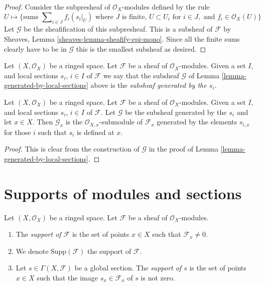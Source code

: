 \begin{proof}
Consider the subpresheaf of $\mathcal{O}_X$-modules
defined by the rule
$$
U
\longmapsto
\{
\text{sums } \sum\nolimits_{i \in J} f_i (s_i|_U)
\text{ where } J \text{ is finite, }
U \subset U_i \text{ for } i\in J, \text{ and }
f_i \in \mathcal{O}_X(U)
\}
$$
Let $\mathcal{G}$ be the sheafification of this subpresheaf.
This is a subsheaf of $\mathcal{F}$ by
Sheaves, Lemma \ref{sheaves-lemma-sheafify-epi-mono}.
Since all the finite sums clearly have to be in $\mathcal{G}$
this is the smallest subsheaf as desired.
\end{proof}

\begin{definition}
\label{definition-generated-by-local-sections}
Let $(X, \mathcal{O}_X)$ be a ringed space.
Let $\mathcal{F}$ be a sheaf of $\mathcal{O}_X$-modules.
Given a set $I$, and
local sections $s_i$, $i \in I$ of $\mathcal{F}$
we say that the subsheaf $\mathcal{G}$ of
Lemma \ref{lemma-generated-by-local-sections}
above is the {\it subsheaf generated by the $s_i$}.
\end{definition}

\begin{lemma}
\label{lemma-generated-by-local-sections-stalk}
Let $(X, \mathcal{O}_X)$ be a ringed space.
Let $\mathcal{F}$ be a sheaf of $\mathcal{O}_X$-modules.
Given a set $I$, and
local sections $s_i$, $i \in I$ of $\mathcal{F}$.
Let $\mathcal{G}$ be the subsheaf generated by the
$s_i$ and let $x\in X$.
Then $\mathcal{G}_x$ is the $\mathcal{O}_{X, x}$-submodule of
$\mathcal{F}_x$ generated by the elements $s_{i, x}$
for those $i$ such that $s_i$ is defined at $x$.
\end{lemma}

\begin{proof}
This is clear from the construction of $\mathcal{G}$
in the proof of Lemma \ref{lemma-generated-by-local-sections}.
\end{proof}










\section{Supports of modules and sections}
\label{section-support}

\begin{definition}
\label{definition-support}
Let $(X, \mathcal{O}_X)$ be a ringed space.
Let $\mathcal{F}$ be a sheaf of $\mathcal{O}_X$-modules.
\begin{enumerate}
\item The {\it support of $\mathcal{F}$} is the set of
points $x \in X$ such that $\mathcal{F}_x \not = 0$.
\item We denote $\text{Supp}(\mathcal{F})$ the support of $\mathcal{F}$.
\item Let $s \in \Gamma(X, \mathcal{F})$ be a global section.
The {\it support of $s$} is the set of points $x \in X$
such that the image $s_x \in \mathcal{F}_x$ of $s$ is
not zero.
\end{enumerate}
\end{definition}

